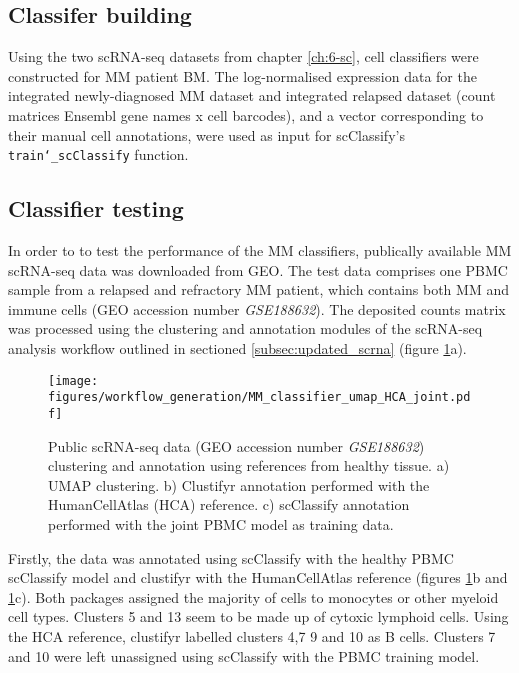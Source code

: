 \subsection{Classifer building}\label{subsec:MM_classifier_model_building}
Using the two scRNA-seq datasets from chapter \ref{ch:6-sc}, cell classifiers were constructed for MM patient BM\@.
The log-normalised expression data for the integrated newly-diagnosed MM dataset and integrated relapsed dataset (count matrices Ensembl gene names x cell barcodes), and a vector corresponding to their manual cell annotations, were used as input for scClassify's \texttt{train\char`_scClassify} function.


\subsection{Classifier testing}
In order to to test the performance of the MM classifiers, publically available MM scRNA-seq data was downloaded from GEO\@.
The test data comprises one PBMC sample from a relapsed and refractory MM patient, which contains both MM and immune cells (GEO accession number \textit{GSE188632}).
The deposited counts matrix was processed using the clustering and annotation modules of the scRNA-seq analysis workflow outlined in sectioned \ref{subsec:updated_scrna} (figure \ref{fig:mm_class_umap}a).
\begin{figure}[htb]
\centering
\texttt{[image: figures/workflow\_generation/MM\_classifier\_umap\_HCA\_joint.pdf]}
\caption[Public scRNA-seq data clustering]{Public scRNA-seq data (GEO accession number \textit{GSE188632}) clustering and annotation using references from healthy tissue.
a) UMAP clustering.
b) Clustifyr annotation performed with the HumanCellAtlas (HCA) reference.
c) scClassify annotation performed with the joint PBMC model as training data.
}
\label{fig:mm_class_umap}
\end{figure}
%
Firstly, the data was annotated using scClassify with the healthy PBMC scClassify model and clustifyr with the HumanCellAtlas reference (figures \ref{fig:mm_class_umap}b and \ref{fig:mm_class_umap}c).
Both packages assigned the majority of cells to monocytes or other myeloid cell types.
Clusters 5 and 13 seem to be made up of cytoxic lymphoid cells.
Using the HCA reference, clustifyr labelled clusters 4,7 9 and 10 as B cells.
Clusters 7 and 10 were left unassigned using scClassify with the PBMC training model.

